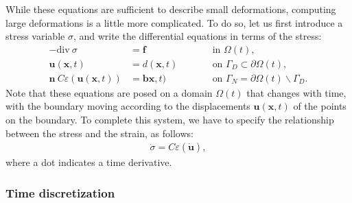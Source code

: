 \documentclass{article}
\renewcommand{\vec}[1]{\mathbf{#1}}
\renewcommand{\div}{\mathrm{div}\ }
\begin{document}
While these equations are sufficient to describe small deformations, computing
large deformations is a little more complicated. To do so, let us first
introduce a stress variable $\sigma$, and write the differential equations in
terms of the stress:
\begin{align*}
  - \div \sigma &= \vec f
  &&\text{in $\Omega(t)$},
  \\
  \vec u(\vec x,t) &= d(\vec x,t)
  \qquad
  &&\text{on $\Gamma_D\subset\partial\Omega(t)$},
  \\
  \vec n \ C \varepsilon(\vec u(\vec x,t)) &= \vec b\vec x,t)
  \qquad
  &&\text{on $\Gamma_N=\partial\Omega(t)\backslash\Gamma_D$}.
\end{align*}
Note that these equations are posed on a domain $\Omega(t)$ that
changes with time, with the boundary moving according to the
displacements $\vec u(\vec x,t)$ of the points on the boundary. To
complete this system, we have to specify the relationship between the
stress and the strain, as follows:
\begin{align*}
  \dot\sigma = C \varepsilon (\dot{\vec u}),
\end{align*}
where a dot indicates a time derivative.


\subsubsection*{Time discretization}
\end{document}
